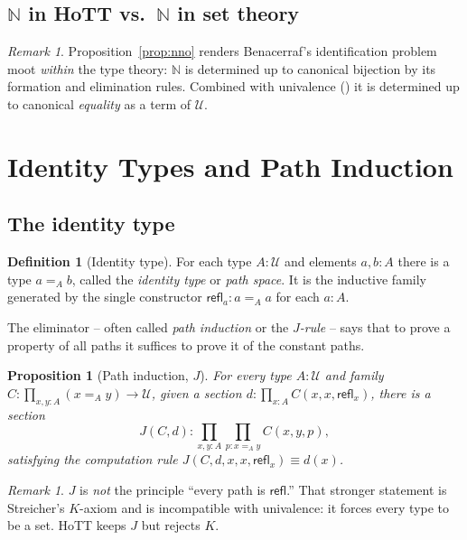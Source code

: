 \documentclass[12pt]{article}
\newtheorem{proposition}[theorem]{Proposition}
\theoremstyle{definition}
\newtheorem{definition}[theorem]{Definition}
\theoremstyle{remark}
\newtheorem{remark}[theorem]{Remark}
\newcommand{\U}{\mathcal{U}}
\newcommand{\N}{\mathbb{N}}
\newcommand{\refl}{\mathsf{refl}}
\begin{document}
\subsection{$\N$ in HoTT vs.\ $\N$ in set theory}
\label{sec:nat-vs-set}

\begin{remark}
\label{rem:benacerraf}
Proposition~\ref{prop:nno} renders Benacerraf's identification problem moot
\emph{within} the type theory: $\N$ is determined up to canonical bijection
by its formation and elimination rules. Combined with univalence
() it is determined up to canonical \emph{equality} as a
term of $\U$.
\end{remark}

\section{Identity Types and Path Induction}
\label{sec:identity}

\subsection{The identity type}

\begin{definition}[Identity type]
\label{def:id}
For each type $A : \U$ and elements $a, b : A$ there is a type
$a =_A b$, called the \emph{identity type} or \emph{path space}. It is the
inductive family generated by the single constructor
$\refl_a : a =_A a$ for each $a : A$.
\end{definition}

The eliminator -- often called \emph{path induction} or the \emph{$J$-rule}
-- says that to prove a property of all paths it suffices to prove it of the
constant paths.

\begin{proposition}[Path induction, $J$]
\label{prop:J}
For every type $A : \U$ and family
$C : \prod_{x, y : A} (x =_A y) \to \U$, given a section
$d : \prod_{x : A} C(x, x, \refl_x)$, there is a section
\[
J(C, d) : \prod_{x, y : A} \prod_{p : x =_A y} C(x, y, p),
\]
satisfying the computation rule $J(C, d, x, x, \refl_x) \equiv d(x)$.
\end{proposition}

\begin{remark}
\label{rem:J-vs-K}
$J$ is \emph{not} the principle ``every path is $\refl$.'' That stronger
statement is Streicher's $K$-axiom and is incompatible with univalence: it
forces every type to be a set. HoTT keeps $J$ but rejects $K$.
\end{remark}
\end{document}
